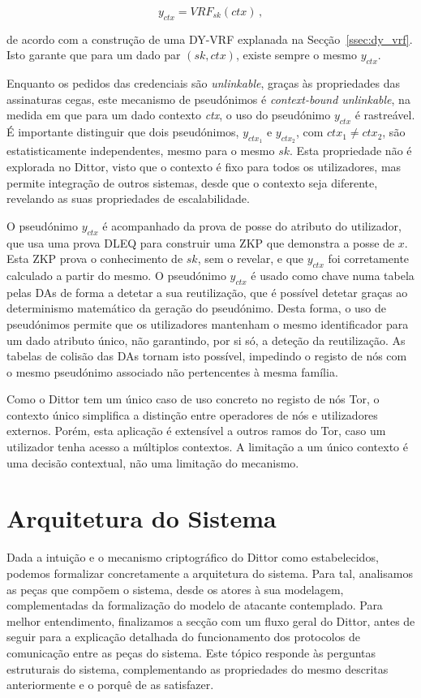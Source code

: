 \begin{equation*}
    y_{ctx} = VRF_{sk}(ctx) \, ,
\end{equation*}

de acordo com a construção de uma DY-VRF explanada na Secção~\ref{ssec:dy_vrf}. Isto garante que para um dado par $(sk, ctx)$, existe sempre o mesmo $y_{ctx}$.

Enquanto os pedidos das credenciais são \textit{unlinkable}, graças às propriedades das assinaturas cegas, este mecanismo de pseudónimos é \textit{context-bound unlinkable}, na medida em que para um dado contexto \textit{ctx}, o uso do pseudónimo $y_{ctx}$ é rastreável. É importante distinguir que dois pseudónimos, $y_{ctx_1}$ e $y_{ctx_2}$, com $ctx_1 \neq ctx_2$, são estatisticamente independentes, mesmo para o mesmo $sk$. Esta propriedade não é explorada no Dittor, visto que o contexto é fixo para todos os utilizadores, mas permite integração de outros sistemas, desde que o contexto seja diferente, revelando as suas propriedades de escalabilidade.

O pseudónimo $y_{ctx}$ é acompanhado da prova de posse do atributo do utilizador, que usa uma prova DLEQ para construir uma ZKP que demonstra a posse de $x$. Esta ZKP prova o conhecimento de $sk$, sem o revelar, e que $y_{ctx}$ foi corretamente calculado a partir do mesmo. O pseudónimo $y_{ctx}$ é usado como chave numa tabela pelas DAs de forma a detetar a sua reutilização, que é possível detetar graças ao determinismo matemático da geração do pseudónimo. Desta forma, o uso de pseudónimos permite que os utilizadores mantenham o mesmo identificador para um dado atributo único, não garantindo, por si só, a deteção da reutilização. As tabelas de colisão das DAs tornam isto possível, impedindo o registo de nós com o mesmo pseudónimo associado não pertencentes à mesma família.

Como o Dittor tem um único caso de uso concreto no registo de nós Tor, o contexto único simplifica a distinção entre operadores de nós e utilizadores externos. Porém, esta aplicação é extensível a outros ramos do Tor, caso um utilizador tenha acesso a múltiplos contextos. A limitação a um único contexto é uma decisão contextual, não uma limitação do mecanismo.

\section{Arquitetura do Sistema}
\label{sec:dittor_arquitetura}

Dada a intuição e o mecanismo criptográfico do Dittor como estabelecidos, podemos formalizar concretamente a arquitetura do sistema. Para tal, analisamos as peças que compõem o sistema, desde os atores à sua modelagem, complementadas da formalização do modelo de atacante contemplado. Para melhor entendimento, finalizamos a secção com um fluxo geral do Dittor, antes de seguir para a explicação detalhada do funcionamento dos protocolos de comunicação entre as peças do sistema. Este tópico responde às perguntas estruturais do sistema, complementando as propriedades do mesmo descritas anteriormente e o porquê de as satisfazer.

